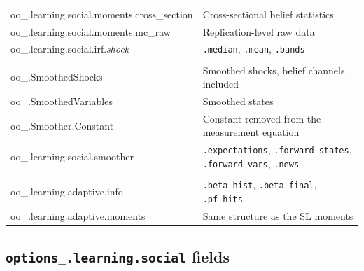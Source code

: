 \documentclass[11pt,a4paper]{article}
\begin{document}
\begin{longtable}{>{\ttfamily\small}p{6.2cm} p{8cm}}
oo\_.learning.social.moments.cross\_section & Cross-sectional belief statistics \\
oo\_.learning.social.moments.mc\_raw & Replication-level raw data \\
oo\_.learning.social.irf.\textit{shock} & \texttt{.median}, \texttt{.mean}, \texttt{.bands} \\
\midrule
\multicolumn{2}{l}{\normalfont\textit{Estimation}} \\
\midrule
oo\_.SmoothedShocks & Smoothed shocks, belief channels included \\
oo\_.SmoothedVariables & Smoothed states \\
oo\_.Smoother.Constant & Constant removed from the measurement equation \\
oo\_.learning.social.smoother & \texttt{.expectations}, \texttt{.forward\_states}, \texttt{.forward\_vars}, \texttt{.news} \\
\midrule
\multicolumn{2}{l}{\normalfont\textit{Adaptive learning}} \\
\midrule
oo\_.learning.adaptive.info & \texttt{.beta\_hist}, \texttt{.beta\_final}, \texttt{.pf\_hits} \\
oo\_.learning.adaptive.moments & Same structure as the SL moments \\
\bottomrule
\end{longtable}


\subsection{\texttt{options\_.learning.social} fields}
\end{document}
